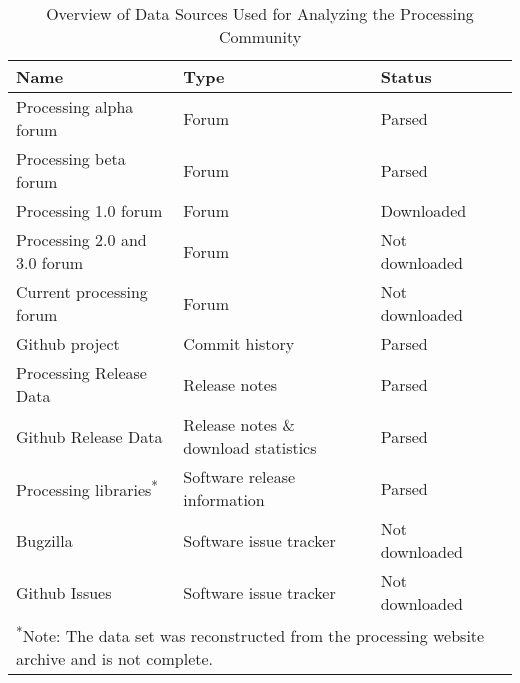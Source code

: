 \begin{table}[h]
    \raggedright
    \caption{Overview of Data Sources Used for Analyzing the Processing Community}
    \label{table:data-sources}
    \begin{tabular}{l l l c}
        \toprule
        Name & Type & Status \\
        \midrule
        Processing alpha forum & Forum & Parsed \\
        Processing beta forum & Forum & Parsed  \\
        Processing 1.0 forum & Forum & Downloaded \\
        Processing 2.0 and 3.0 forum & Forum  & Not downloaded \\
        Current processing forum & Forum & Not downloaded\\
        Github project & Commit history & Parsed \\
        Processing Release Data & Release notes & Parsed \\
        Github Release Data & Release notes \& download statistics & Parsed \\
        Processing libraries\textsuperscript{*} & Software release information & Parsed \\
        Bugzilla & Software issue tracker & Not downloaded \\
        Github Issues & Software issue tracker & Not downloaded \\
        \bottomrule
        \multicolumn{3}{l}{\footnotesize \textsuperscript{*}Note: The data set was reconstructed from the processing website archive and is not complete.}
    \end{tabular}
  \end{table}

